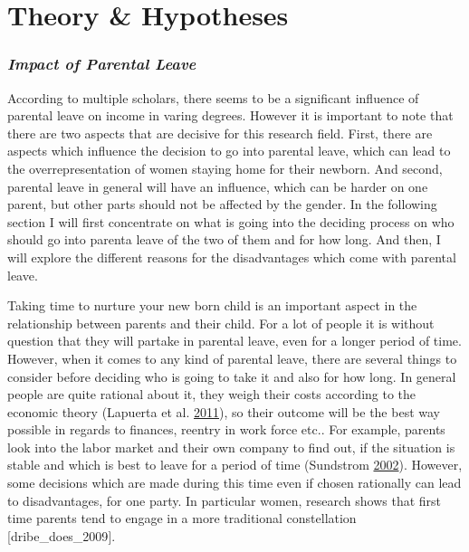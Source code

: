 \documentclass[
  12pt,
]{article}
\begin{document}
\hypertarget{theory-hypotheses}{%
\section{Theory \& Hypotheses}\label{theory-hypotheses}}

\hypertarget{impact-of-parental-leave}{%
\subsubsection*{\texorpdfstring{\emph{Impact of Parental Leave}}{Impact of Parental Leave}}\label{impact-of-parental-leave}}

According to multiple scholars, there seems to be a significant influence of parental leave on income in varing degrees.
However it is important to note that there are two aspects that are decisive for this research field. First, there are aspects which influence the decision to go into parental leave, which can lead to the overrepresentation of women staying home for their newborn. And second, parental leave in general will have an influence, which can be harder on one parent, but other parts should not be affected by the gender. In the following section I will first concentrate on what is going into the deciding process on who should go into parenta leave of the two of them and for how long. And then, I will explore the different reasons for the disadvantages which come with parental leave.

Taking time to nurture your new born child is an important aspect in the relationship between parents and their child. For a lot of people it is without question that they will partake in parental leave, even for a longer period of time. However, when it comes to any kind of parental leave, there are several things to consider before deciding who is going to take it and also for how long. In general people are quite rational about it, they weigh their costs according to the economic theory (Lapuerta et al. \protect\hyperlink{ref-lapuerta_individual_2011}{2011}), so their outcome will be the best way possible in regards to finances, reentry in work force etc.. For example, parents look into the labor market and their own company to find out, if the situation is stable and which is best to leave for a period of time (Sundstrom \protect\hyperlink{ref-sundstrom_gender_2002}{2002}). However, some decisions which are made during this time even if chosen rationally can lead to disadvantages, for one party. In particular women, research shows that first time parents tend to engage in a more traditional constellation {[}dribe\_does\_2009{]}.
\end{document}
